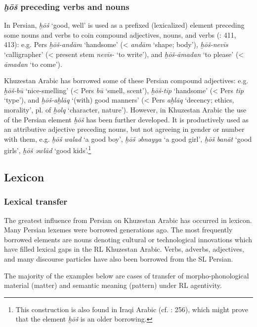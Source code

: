 \documentclass[output=paper,nonflat]{langsci/langscibook}
\begin{document}
\subsubsection{\textit{ḫōš} preceding verbs and nouns} \label{xosh}

In Persian, \textit{ḫōš} ‘good, well’ is used as a prefixed (lexicalized) element preceding some nouns and verbs to coin compound adjectives, nouns, and verbs (\citealt{Majidi1990}: 411, 413): e.g. Pers \textit{ḫōš-andām} ‘handsome’ (< \textit{andām} ‘shape; body’), \textit{ḫōš-nevīs} ‘calligrapher’ (< present stem \textit{nevīs-} ‘to write’), and \textit{ḫōš-āmadan} ‘to please’ (< \textit{āmadan} ‘to come’).

Khuzestan Arabic has borrowed some of these Persian compound adjectives: e.g. \textit{ḫōš-bū} ‘nice-smelling’ (< Pers \textit{bū} ‘smell, scent’), \textit{ḫōš-tīp} ‘handsome’ (< Pers \textit{tīp} ‘type’), and \textit{ḫōš-aḫlāq} ‘(with) good manners’ (< Pers \textit{aḫlāq} ‘decency; ethics, morality’, pl. of \textit{ḫolq} ‘character, nature’). However, in Khuzestan Arabic the use of the Persian element \textit{ḫōš} has been further developed. It is productively used as an attributive adjective preceding nouns, but not agreeing in gender or number with them, e.g. \textit{ḫōš} \textit{walad} ‘a good boy’, \textit{ḫōš} \textit{əbnayya} ‘a good girl’, \textit{ḫōš} \textit{banāt} ‘good girls’, \textit{ḫōš} \textit{əwlād} ‘good kids’.\footnote{This construction is also found in Iraqi Arabic (cf. \citealt{Erwin1963}: 256), which might prove that the element \textit{ḫōš} is an older borrowing.}



\subsection{Lexicon}
\subsubsection{Lexical transfer}

The greatest influence from Persian on Khuzestan Arabic has occurred in lexicon. Many Persian lexemes were borrowed generations ago. The most frequently borrowed elements are nouns denoting cultural or technological innovations which have filled lexical gaps in the RL Khuzestan Arabic. Verbs, adverbs, adjectives, and many discourse particles have also been borrowed from the SL Persian.

The majority of the examples below are cases of transfer of morpho-phonological material (matter) and semantic meaning (pattern) under RL agentivity. 
\end{document}
